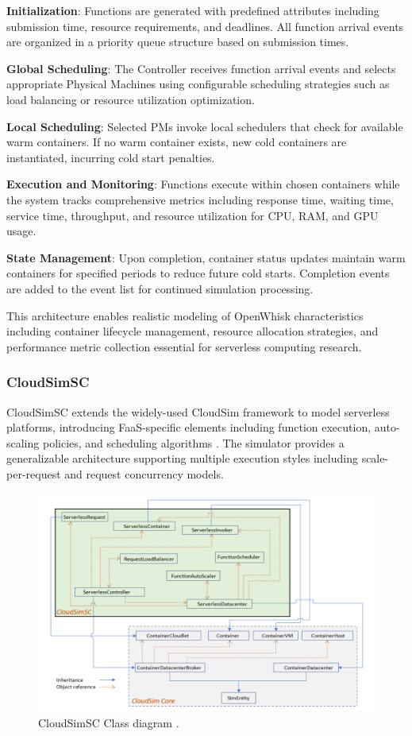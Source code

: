 \textbf{Initialization}: Functions are generated with predefined attributes including submission time, resource requirements, and deadlines. All function arrival events are organized in a priority queue structure based on submission times.

\textbf{Global Scheduling}: The Controller receives function arrival events and selects appropriate Physical Machines using configurable scheduling strategies such as load balancing or resource utilization optimization.

\textbf{Local Scheduling}: Selected PMs invoke local schedulers that check for available warm containers. If no warm container exists, new cold containers are instantiated, incurring cold start penalties.

\textbf{Execution and Monitoring}: Functions execute within chosen containers while the system tracks comprehensive metrics including response time, waiting time, service time, throughput, and resource utilization for CPU, RAM, and GPU usage.

\textbf{State Management}: Upon completion, container status updates maintain warm containers for specified periods to reduce future cold starts. Completion events are added to the event list for continued simulation processing.

This architecture enables realistic modeling of OpenWhisk characteristics including container lifecycle management, resource allocation strategies, and performance metric collection essential for serverless computing research.

\subsubsection{CloudSimSC}


CloudSimSC extends the widely-used CloudSim framework to model serverless platforms, introducing FaaS-specific elements including function execution, auto-scaling policies, and scheduling algorithms \cite{mampage2021cloudsimsc}. The simulator provides a generalizable architecture supporting multiple execution styles including scale-per-request and request concurrency models.

\begin{figure}[htbp]
\centering
\includegraphics[width=1\textwidth]{Assets/cloudsimcs.png}
\caption{CloudSimSC Class diagram  \cite{mampage2021cloudsimsc}.}
\label{fig:cloudsimsc-architecture}
\end{figure}

